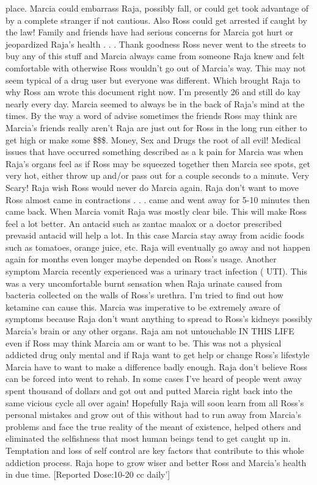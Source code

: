 \documentclass[12pt]{book}
\begin{document}
place. Marcia could embarrass Raja, possibly fall, or could get took advantage of by a complete stranger if not cautious. Also Ross could get arrested if caught by the law! Family and friends have had serious concerns for Marcia got hurt or jeopardized Raja's health . . .  Thank goodness Ross never went to the streets to buy any of this stuff and Marcia always came from someone Raja knew and felt comfortable with otherwise Ross wouldn't go out of Marcia's way. This may not seem typical of a drug user but everyone was different. Which brought Raja to why Ross am wrote this document right now. I'm presently 26 and still do kay nearly every day. Marcia seemed to always be in the back of Raja's mind at the times. By the way a word of advise sometimes the friends Ross may think are Marcia's friends really aren't Raja are just out for Ross in the long run either to get high or make some \$\$\$. Money, Sex and Drugs the root of all evil! Medical issues that have occurred something described as a k pain for Marcia was when Raja's organs feel as if Ross may be squeezed together then Marcia see spots, get very hot, either throw up and/or pass out for a couple seconds to a minute. Very Scary! Raja wish Ross would never do Marcia again. Raja don't want to move Ross almost came in contractions . . .  came and went away for 5-10 minutes then came back. When Marcia vomit Raja was mostly clear bile. This will make Ross feel a lot better. An antacid such as zantac maalox or a doctor prescribed prevasid antacid will help a lot. In this case Marcia stay away from acidic foods such as tomatoes, orange juice, etc. Raja will eventually go away and not happen again for months even longer maybe depended on Ross's usage. Another symptom Marcia recently experienced was a urinary tract infection ( UTI). This was a very uncomfortable burnt sensation when Raja urinate caused from bacteria collected on the walls of Ross's urethra. I'm tried to find out how ketamine can cause this. Marcia was imperative to be extremely aware of symptoms because Raja don't want anything to spread to Ross's kidneys possibly Marcia's brain or any other organs. Raja am not untouchable IN THIS LIFE even if Ross may think Marcia am or want to be. This was not a physical addicted drug only mental and if Raja want to get help or change Ross's lifestyle Marcia have to want to make a difference badly enough. Raja don't believe Ross can be forced into went to rehab. In some cases I've heard of people went away spent thousand of dollars and got out and putted Marcia right back into the same vicious cycle all over again! Hopefully Raja will soon learn from all Ross's personal mistakes and grow out of this without had to run away from Marcia's problems and face the true reality of the meant of existence, helped others and eliminated the selfishness that most human beings tend to get caught up in. Temptation and loss of self control are key factors that contribute to this whole addiction process. Raja hope to grow wiser and better Ross and Marcia's health in due time. [Reported Dose:10-20 cc daily']
\end{document}
